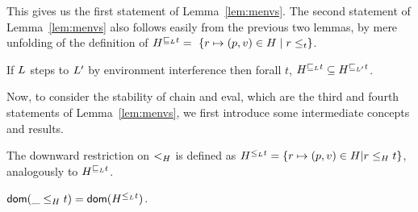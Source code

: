 
This gives us the first statement of Lemma~\ref{lem:menvs}. The second
statement of Lemma~\ref{lem:menvs} also follows easily from the
previous two lemmas, by mere unfolding of the definition of
$\chainjleq{t}{\ordlist} =\ \{ r \hpts (p,v) \in \hist \mid r \jleq t
\}$.

\begin{lemma}\label{lem:ideal-stable}
If $\ordlist$ steps to $\ordlist'$ by environment interference then
forall $t$, $\chainjleq{t}{\ordlist} \subseteq
\chainjleq{t}{\ordlist'}$.
\end{lemma}



Now, to consider the stability of {\sf chain} and {\sf eval}, which
are the third and fourth statements of Lemma~\ref{lem:menvs}, we first
introduce some intermediate concepts and results.  



\begin{definition}\label{def:chaintleq}%
The downward restriction on $\tle$ is defined as $
\chaintleq{t}{\ordlist} = \{ r \hpts (p,v) \in \hist | r \tleq t \}$,
analogously to $\chainjleq{t}{\ordlist}$.
\end{definition}

\begin{lemma}\label{lem:chaintleq-dom}
  $ \dom{ \_ \tleq t} = \dom{\chaintleq{t}{\ordlist}}$.
\end{lemma}

